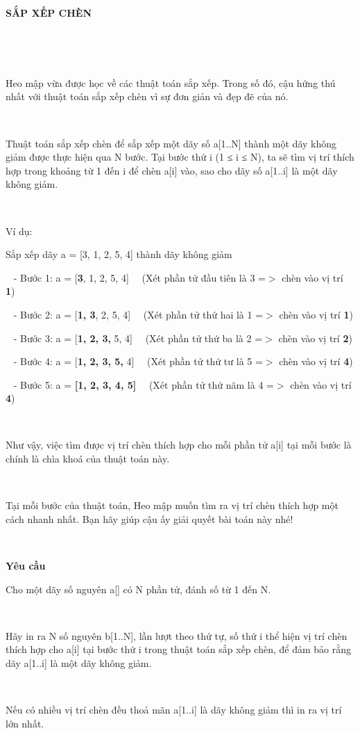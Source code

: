 

\textbf{SẮP XẾP CHÈN}

 

 

Heo mập vừa được học về các thuật toán sắp xếp. Trong số đó, cậu hứng thú nhất với thuật toán sắp xếp chèn vì sự đơn giản và đẹp đẽ của nó.

 

Thuật toán sắp xếp chèn để sắp xếp một dãy số a[1..N] thành một dãy không giảm được thực hiện qua N bước. Tại bước thứ i (1 ≤ i ≤ N), ta sẽ tìm vị trí thích hợp trong khoảng từ 1 đến i để chèn a[i] vào, sao cho dãy số a[1..i] là một dãy không giảm.

 

Ví dụ:

Sắp xếp dãy a = [3, 1, 2, 5, 4] thành dãy không giảm

  - Bước 1: a = [\textbf{3}, 1, 2, 5, 4]   (Xét phần tử đầu tiên là 3 =$>$ chèn vào vị trí \textbf{1})

  - Bước 2: a = [\textbf{1, 3}, 2, 5, 4]   (Xét phần tử thứ hai là 1 =$>$ chèn vào vị trí \textbf{1})

  - Bước 3: a = [\textbf{1, 2, 3,} 5, 4]   (Xét phần tử thứ ba là 2 =$>$ chèn vào vị trí \textbf{2})

  - Bước 4: a = [\textbf{1, 2, 3, 5,} 4]   (Xét phần tử thứ tư là 5 =$>$ chèn vào vị trí \textbf{4})

  - Bước 5: a = \textbf{[1, 2, 3, 4, 5]}   (Xét phần tử thứ năm là 4 =$>$ chèn vào vị trí \textbf{4})

 

Như vậy, việc tìm được vị trí chèn thích hợp cho mỗi phần tử a[i] tại mỗi bước là chính là chìa khoá của thuật toán này.

 

Tại mỗi bước của thuật toán, Heo mập muốn tìm ra vị trí chèn thích hợp một cách nhanh nhất. Bạn hãy giúp cậu ấy giải quyết bài toán này nhé!

 

\textbf{Yêu cầu}

Cho một dãy số nguyên a[] có N phần tử, đánh số từ 1 đến N.

 

Hãy in ra N số nguyên b[1..N], lần lượt theo thứ tự, số thứ i thể hiện vị trí chèn thích hợp cho a[i] tại bước thứ i trong thuật toán sắp xếp chèn, để đảm bảo rằng dãy a[1..i] là một dãy không giảm.

 

Nếu có nhiều vị trí chèn đều thoả mãn a[1..i] là dãy không giảm thì in ra vị trí lớn nhất.


